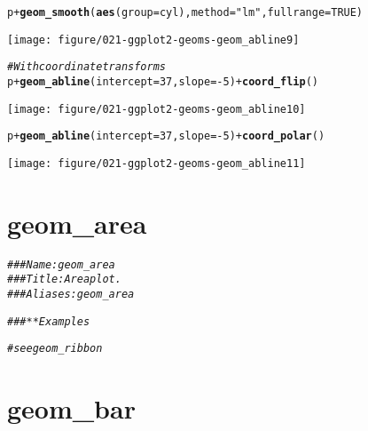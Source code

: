 \documentclass[a4paper,titlepage]{tufte-handout}\usepackage[]{graphicx}\usepackage[]{color}
\makeatletter
\def\maxwidth{ %
  \ifdim\Gin@nat@width>\linewidth
    \linewidth
  \else
    \Gin@nat@width
  \fi
}
\newcommand{\hlnum}[1]{\textcolor[rgb]{0.686,0.059,0.569}{#1}}%
\newcommand{\hlstr}[1]{\textcolor[rgb]{0.192,0.494,0.8}{#1}}%
\newcommand{\hlcom}[1]{\textcolor[rgb]{0.678,0.584,0.686}{\textit{#1}}}%
\newcommand{\hlopt}[1]{\textcolor[rgb]{0,0,0}{#1}}%
\newcommand{\hlstd}[1]{\textcolor[rgb]{0.345,0.345,0.345}{#1}}%
\newcommand{\hlkwc}[1]{\textcolor[rgb]{0.333,0.667,0.333}{#1}}%
\newcommand{\hlkwd}[1]{\textcolor[rgb]{0.737,0.353,0.396}{\textbf{#1}}}%
\newenvironment{kframe}{%
 \def\at@end@of@kframe{}%
 \ifinner\ifhmode%
  \def\at@end@of@kframe{\end{minipage}}%
  \begin{minipage}{\columnwidth}%
 \fi\fi%
 \def\FrameCommand##1{\hskip\@totalleftmargin \hskip-\fboxsep
 \colorbox{shadecolor}{##1}\hskip-\fboxsep
     \hskip-\linewidth \hskip-\@totalleftmargin \hskip\columnwidth}%
 \MakeFramed {\advance\hsize-\width
   \@totalleftmargin\z@ \linewidth\hsize
   \@setminipage}}%
 {\par\unskip\endMakeFramed%
 \at@end@of@kframe}
\newenvironment{knitrout}{}{} %
\makeatother
\begin{document}
\begin{knitrout}
\begin{kframe}
\begin{alltt}
\hlstd{p} \hlopt{+} \hlkwd{geom_smooth}\hlstd{(}\hlkwd{aes}\hlstd{(}\hlkwc{group}\hlstd{=cyl),} \hlkwc{method}\hlstd{=}\hlstr{"lm"}\hlstd{,} \hlkwc{fullrange}\hlstd{=}\hlnum{TRUE}\hlstd{)}
\end{alltt}
\end{kframe}
\texttt{[image: figure/021-ggplot2-geoms-geom\_abline9]} 
\begin{kframe}\begin{alltt}
\hlcom{# With coordinate transforms}
\hlstd{p} \hlopt{+} \hlkwd{geom_abline}\hlstd{(}\hlkwc{intercept} \hlstd{=} \hlnum{37}\hlstd{,} \hlkwc{slope} \hlstd{=} \hlopt{-}\hlnum{5}\hlstd{)} \hlopt{+} \hlkwd{coord_flip}\hlstd{()}
\end{alltt}
\end{kframe}
\texttt{[image: figure/021-ggplot2-geoms-geom\_abline10]} 
\begin{kframe}\begin{alltt}
\hlstd{p} \hlopt{+} \hlkwd{geom_abline}\hlstd{(}\hlkwc{intercept} \hlstd{=} \hlnum{37}\hlstd{,} \hlkwc{slope} \hlstd{=} \hlopt{-}\hlnum{5}\hlstd{)} \hlopt{+} \hlkwd{coord_polar}\hlstd{()}
\end{alltt}
\end{kframe}
\texttt{[image: figure/021-ggplot2-geoms-geom\_abline11]} 

\end{knitrout}



\section{geom\_area}

\begin{knitrout}
\color{fgcolor}\begin{kframe}
\begin{alltt}
\hlcom{### Name: geom_area}
\hlcom{### Title: Area plot.}
\hlcom{### Aliases: geom_area}

\hlcom{### ** Examples}

\hlcom{# see geom_ribbon}
\end{alltt}
\end{kframe}
\end{knitrout}



\section{geom\_bar}
\end{document}
